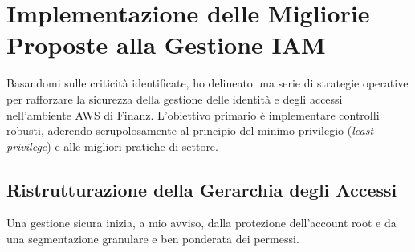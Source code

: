 \section{Implementazione delle Migliorie Proposte alla Gestione IAM}
\label{sec:implementazione_migliorie_iam}

Basandomi sulle criticità identificate, ho delineato una serie di strategie operative per rafforzare la sicurezza della gestione delle identità e degli accessi nell'ambiente AWS di Finanz. L'obiettivo primario è implementare controlli robusti, aderendo scrupolosamente al principio del minimo privilegio (\emph{least privilege}) e alle migliori pratiche di settore.

\subsection{Ristrutturazione della Gerarchia degli Accessi}
Una gestione sicura inizia, a mio avviso, dalla protezione dell'account root e da una segmentazione granulare e ben ponderata dei permessi.

